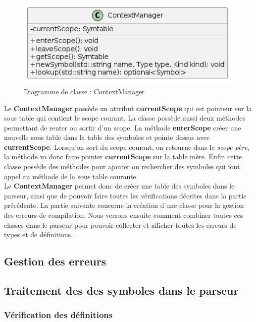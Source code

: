 \documentclass[a4paper]{article}%
\begin{document}
\begin{figure}[h!]
  \begin{center}
  \includegraphics[scale=0.5]{../ressources/diagrams/contextManager.png}
  \caption{Diagramme de classe : ContextManager}
  \end{center}
\end{figure}

Le \textbf{ContextManager} possède un attribut \textbf{currentScope} qui est pointeur sur
la sous table qui contient le scope courant. La classe possède aussi deux
méthodes permettant de renter ou sortir d'un scope. La méthode
\textbf{enterScope} créer une nouvelle sous table dans la table des symboles et
pointe dessus avec \textbf{currentScope}. Lorsqu'on sort du scope courant, on
retourne dans le \textit{scope père}, la méthode va donc faire pointer
\textbf{currentScope} sur la table mère. Enfin cette classe possède des méthodes
pour ajouter ou rechercher des symboles qui font appel au méthode de la sous
table courante.\\

Le \textbf{ContextManager} permet donc de créer une table des symboles dans le
parseur, ainsi que de pouvoir faire toutes les vérifications décrites dans la
partie précédente. La partie suivante concerne la création d'une classe pour la
gestion des erreurs de compilation. Nous verrons ensuite comment combiner toutes
ces classes dans le parseur pour pouvoir collecter et afficher toutes les
erreurs de types et de définitions.

\subsection{Gestion des erreurs}


\subsection{Traitement des des symboles dans le parseur}

\subsubsection*{Vérification des définitions}
\end{document}

